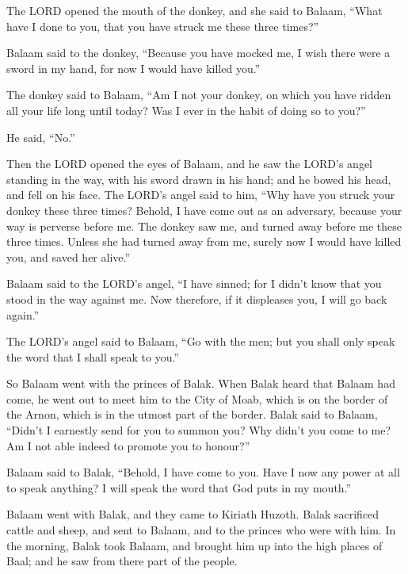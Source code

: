  The LORD opened the mouth of the donkey, and she said to
Balaam, ``What have I done to you, that you have struck me these three
times?''

 Balaam said to the donkey, ``Because you have mocked me,
I wish there were a sword in my hand, for now I would have killed you.''

 The donkey said to Balaam, ``Am I not your donkey, on
which you have ridden all your life long until today? Was I ever in the
habit of doing so to you?''

He said, ``No.''

 Then the LORD opened the eyes of Balaam, and he saw the
LORD's angel standing in the way, with his sword drawn in his hand; and
he bowed his head, and fell on his face.  The LORD's
angel said to him, ``Why have you struck your donkey these three times?
Behold, I have come out as an adversary, because your way is perverse
before me.  The donkey saw me, and turned away before me
these three times. Unless she had turned away from me, surely now I
would have killed you, and saved her alive.''

 Balaam said to the LORD's angel, ``I have sinned; for I
didn't know that you stood in the way against me. Now therefore, if it
displeases you, I will go back again.''

 The LORD's angel said to Balaam, ``Go with the men; but
you shall only speak the word that I shall speak to you.''

So Balaam went with the princes of Balak.  When Balak
heard that Balaam had come, he went out to meet him to the City of Moab,
which is on the border of the Arnon, which is in the utmost part of the
border.  Balak said to Balaam, ``Didn't I earnestly send
for you to summon you? Why didn't you come to me? Am I not able indeed
to promote you to honour?''

 Balaam said to Balak, ``Behold, I have come to you. Have
I now any power at all to speak anything? I will speak the word that God
puts in my mouth.''

 Balaam went with Balak, and they came to Kiriath Huzoth.
 Balak sacrificed cattle and sheep, and sent to Balaam,
and to the princes who were with him.  In the morning,
Balak took Balaam, and brought him up into the high places of Baal; and
he saw from there part of the people.

